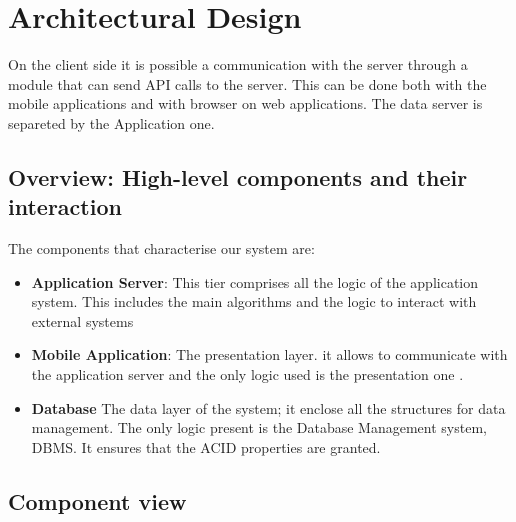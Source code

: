 \documentclass[a4paper]{article}
\begin{document}
\newpage

\section{Architectural Design}



On the client side it is possible a communication with the server through a module that can send API calls to the server. This can be done both with the mobile applications and with browser on web applications.
The data server is separeted by the Application one.




\subsection{Overview: High-level components and their interaction}

The components that characterise our system are:

\begin{itemize}
    \item \textbf{Application Server}: This tier comprises all the logic of the application system. This includes the main algorithms and the logic to interact with external systems
    
    \item \textbf{Mobile Application}: The presentation layer.
it allows to communicate with the application server and the only logic used is the presentation one .

   \item \textbf{Database} The data layer of the system; it enclose all the structures for data management. The only logic present is the Database Management system, DBMS. It ensures that the ACID properties are granted.
\end{itemize}


\newpage

\subsection{Component view}
\end{document}
